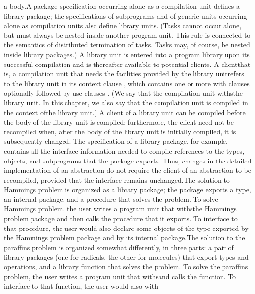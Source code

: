 a body.\Endpara[]
\Para[]A package specification occurring alone as a compilation unit
defines a \txtxemph[]library package\txtxendemph[]; the specifications
of subprograms and of generic units occurring alone as compilation
units also define library units. (Tasks cannot occur alone, but must
always be nested inside another program unit. This rule is connected
to the semantics of distributed termination of tasks. Tasks may, of
course, be nested inside library packages.) A library unit is entered
into a program library upon its successful compilation and is thereafter
available to potential clients. A client\EmDash[]that is, a compilation
unit that needs the facilities provided by the library unit\EmDash[]refers
to the library unit in its \txtxemph[]context clause%
\txtxendemph[], which contains one or more \txtxemph[]with clauses%
\txtxendemph[] optionally followed by \txtxemph[]use clauses%
\txtxendemph[]. (We say that the compilation unit \ldquo[]withs\rdquo[]
the library unit. In this chapter, we also say that the compilation
unit is compiled \ldquo[]in the context of\rdquo[] the library unit.)
A client of a library unit can be compiled before the body of the
library unit is compiled; furthermore, the client need not be recompiled
when, after the body of the library unit is initially compiled, it
is subsequently changed. The specification of a library package, for
example, contains all the interface information needed to compile
references to the types, objects, and subprograms that the package
exports. Thus, changes in the detailed implementation of an abstraction
do not require the client of an abstraction to be recompiled, provided
that the interface remains unchanged.\Endpara[]
\Para[]The solution to Hamming\rsquo[]s problem is organized as a
library package; the package exports a type, an internal package,
and a procedure that solves the problem. To solve Hamming\rsquo[]s
problem, the user writes a program unit that \ldquo[]withs\rdquo[]
the Hamming\rsquo[]s problem package and then calls the procedure
that it exports. To interface to that procedure, the user would also
declare some objects of the type exported by the Hamming\rsquo[]s
problem package and by its internal package.\Endpara[]
\Para[]The solution to the paraffins problem is organized somewhat
differently, in three parts: a pair of library packages (one for radicals,
the other for molecules) that export types and operations, and a library
function that solves the problem. To solve the paraffins problem,
the user writes a program unit that \ldquo[]withs\rdquo[] and calls
the function. To interface to that function, the user would also \ldquo[]with\rdquo[]
